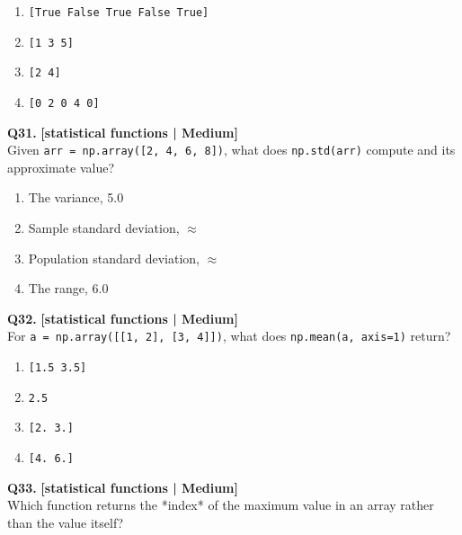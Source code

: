 \begin{enumerate}[label=(\alph*),topsep=2pt,itemsep=1pt,partopsep=0pt,parsep=0pt]
    \item \relax \texttt{[True False True False True]}
    \item \relax \texttt{[1 3 5]}
    \item \relax \texttt{[2 4]}
    \item \relax \texttt{[0 2 0 4 0]}
\end{enumerate}
\vspace{2mm}

\noindent\textbf{Q31.} \hfill {\small\color{LPUOrange}\textbf{[statistical functions | Medium]}}\\[2pt]
Given \texttt{arr = np.array([2, 4, 6, 8])}, what does \texttt{np.std(arr)} compute and its approximate value?

\begin{enumerate}[label=(\alph*),topsep=2pt,itemsep=1pt,partopsep=0pt,parsep=0pt]
    \item \relax The variance, 5.0
    \item \relax Sample standard deviation, $\approx$
    \item \relax Population standard deviation, $\approx$
    \item \relax The range, 6.0
\end{enumerate}
\vspace{2mm}

\noindent\textbf{Q32.} \hfill {\small\color{LPUOrange}\textbf{[statistical functions | Medium]}}\\[2pt]
For \texttt{a = np.array([[1, 2], [3, 4]])}, what does \texttt{np.mean(a, axis=1)} return?

\begin{enumerate}[label=(\alph*),topsep=2pt,itemsep=1pt,partopsep=0pt,parsep=0pt]
    \item \relax \texttt{[1.5 3.5]}
    \item \relax \texttt{2.5}
    \item \relax \texttt{[2. 3.]}
    \item \relax \texttt{[4. 6.]}
\end{enumerate}
\vspace{2mm}

\noindent\textbf{Q33.} \hfill {\small\color{LPUOrange}\textbf{[statistical functions | Medium]}}\\[2pt]
Which function returns the *index* of the maximum value in an array rather than the value itself?

